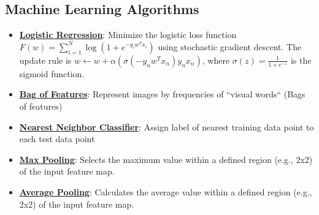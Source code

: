 \documentclass{article}%
\begin{document}
\subsection{Machine Learning Algorithms}%
\label{subsec:MachineLearningAlgorithms}%
\begin{itemize}[leftmargin=*]%
\item \href{https://purdue.brightspace.com/d2l/common/assets/pdfjs-d2l-dist/1.0.14-legacy/web/viewer.html?file=\%2Fcontent\%2Fenforced\%2F1095467-wl.202510.CS.24300.001\%2F05L2-ML Basics.pdf\%3Fou\%3D1095467\&lang=en-us\&container=d2l-fileviewer-rendered-pdf\&fullscreen=d2l-fileviewer-rendered-pdf-dialog\&height=667#page=31}{\textbf{Logistic Regression}}: Minimize the logistic loss function $F(w) = \sum_{i=1}^{N} \log(1 + e^{-y_iw^Tx_i})$ using stochastic gradient descent. The update rule is $w \leftarrow w + \alpha(\sigma(-y_nw^Tx_n)y_nx_n)$, where $\sigma(z) = \frac{1}{1 + e^{-z}}$ is the sigmoid function.%
\item \href{https://purdue.brightspace.com/d2l/common/assets/pdfjs-d2l-dist/1.0.14-legacy/web/viewer.html?file=\%2Fcontent\%2Fenforced\%2F1095467-wl.202510.CS.24300.001\%2F07L2-Vision.pdf\%3Fou\%3D1095467\&lang=en-us\&container=d2l-fileviewer-rendered-pdf\&fullscreen=d2l-fileviewer-rendered-pdf-dialog\&height=667#page=16}{\textbf{Bag of Features}}: Represent images by frequencies of ``visual words`` (Bags of features)%
\item \href{https://purdue.brightspace.com/d2l/common/assets/pdfjs-d2l-dist/1.0.14-legacy/web/viewer.html?file=\%2Fcontent\%2Fenforced\%2F1095467-wl.202510.CS.24300.001\%2F07L2-Vision.pdf\%3Fou\%3D1095467\&lang=en-us\&container=d2l-fileviewer-rendered-pdf\&fullscreen=d2l-fileviewer-rendered-pdf-dialog\&height=667#page=30}{\textbf{Nearest Neighbor Classifier}}: Assign label of nearest training data point to each test data point%
\item \href{https://purdue.brightspace.com/d2l/common/assets/pdfjs-d2l-dist/1.0.14-legacy/web/viewer.html?file=\%2Fcontent\%2Fenforced\%2F1095467-wl.202510.CS.24300.001\%2F09L1-cnn.pdf\%3Fou\%3D1095467\&lang=en-us\&container=d2l-fileviewer-rendered-pdf\&fullscreen=d2l-fileviewer-rendered-pdf-dialog\&height=667#page=15}{\textbf{Max Pooling}}: Selects the maximum value within a defined region (e.g., 2x2) of the input feature map.%
\item \href{https://purdue.brightspace.com/d2l/common/assets/pdfjs-d2l-dist/1.0.14-legacy/web/viewer.html?file=\%2Fcontent\%2Fenforced\%2F1095467-wl.202510.CS.24300.001\%2F09L1-cnn.pdf\%3Fou\%3D1095467\&lang=en-us\&container=d2l-fileviewer-rendered-pdf\&fullscreen=d2l-fileviewer-rendered-pdf-dialog\&height=667#page=15}{\textbf{Average Pooling}}: Calculates the average value within a defined region (e.g., 2x2) of the input feature map.%

\end{itemize}
\end{document}
